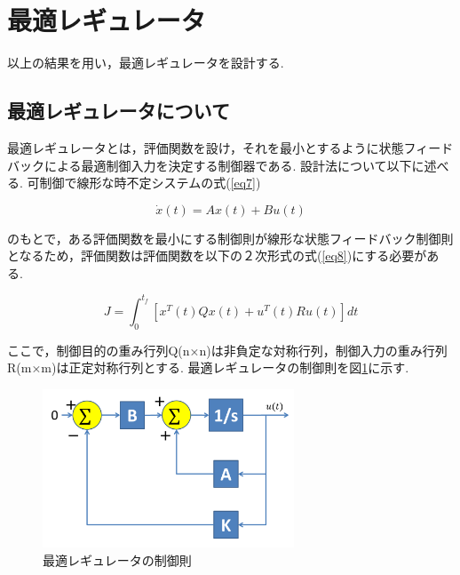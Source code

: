 \documentclass[12pt,oneside]{sotsuken_paper}
\begin{document}
\section{最適レギュレータ}
以上の結果を用い，最適レギュレータを設計する.

\subsection{最適レギュレータについて}

最適レギュレータとは，評価関数を設け，それを最小とするように状態フィードバックによる最適制御入力を決定する制御器である.
設計法について以下に述べる.
可制御で線形な時不定システムの式(\ref{eq7})

\begin{equation}
	\dot{x}(t) = Ax(t)+Bu(t)
	\label{eq10}
\end{equation}

のもとで，ある評価関数を最小にする制御則が線形な状態フィードバック制御則となるため，評価関数は評価関数を以下の２次形式の式(\ref{eq8})にする必要がある.

\begin{equation}
	J = \int^{t_f}_0 [x^T(t)Qx(t)+u^T(t)Ru(t)]dt
	\label{eq11}
\end{equation}

ここで，制御目的の重み行列Q(n×n)は非負定な対称行列，制御入力の重み行列R(m×m)は正定対称行列とする.\cite{regulator}
最適レギュレータの制御則を図\ref{fig:regyureta}に示す.

\begin{figure}[htbp]
	\begin{center}
		\includegraphics[width=75mm]{image/susiki/regulator.png}
		\caption{最適レギュレータの制御則}
		\label{fig:regyureta}
	\end{center}
\end{figure}
\end{document}
